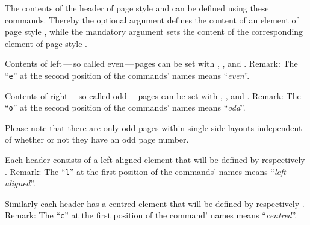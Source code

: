 \begin{Declaration}
                \\
                \\
                \\
                \\
                \\
\end{Declaration}
%
%
%
%
%
%
The contents of the header of page style  and
 can be defined using these commands. Thereby the
optional argument defines the content of an element of page style
, while the mandatory argument sets the content
of the corresponding element of page style .

Contents of left\,---\,so called even\,---\,pages can be set with
, , and . Remark: The ``\texttt{e}''
at the second position of the commands' names means ``\emph{even}''.

Contents of right\,---\,so called odd\,---\,pages can be set with
, , and . Remark: The ``\texttt{o}''
at the second position of the commands' names means ``\emph{odd}''.

Please note that there are only odd pages within single
side layouts independent of whether or not they have an odd page number.

Each header consists of a left aligned element that will be defined by
 respectively . Remark: The ``\texttt{l}'' at the
first position of the commands' names means ``\emph{left aligned}''.

Similarly each header has a centred element that will be defined by
 respectively . Remark: The ``\texttt{c}'' at the
first position of the command' names means ``\emph{centred}''.

